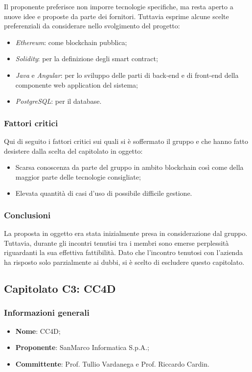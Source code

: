 \documentclass[11pt]{article}
\begin{document}
        \noindent
        Il proponente preferisce non imporre tecnologie specifiche, ma resta aperto a nuove idee e proposte da parte dei fornitori.
        Tuttavia esprime alcune scelte preferenziali da considerare nello svolgimento del progetto:	
        \begin{itemize}
		    \item \textit{Ethereum}: come blockchain pubblica;
		    \item \textit{Solidity}: per la definizione degli smart contract;
			\item \textit{Java} e \textit{Angular}: per lo sviluppo delle parti di back-end e di front-end della componente
			web application del sistema;
			\item \textit{PostgreSQL}: per il database.
		\end{itemize}
    
    \subsubsection{Fattori critici}
    Qui di seguito i fattori critici sui quali si è soffermato il gruppo e che hanno fatto desistere dalla scelta del capitolato in
    oggetto:
   	\begin{itemize}
		\item Scarsa conoscenza da parte del gruppo in ambito blockchain così come della maggior parte delle tecnologie consigliate;
		\item Elevata quantità di casi d'uso di possibile difficile gestione.
	\end{itemize}
	
    \subsubsection{Conclusioni}
    La proposta in oggetto era stata inizialmente presa in considerazione dal gruppo. Tuttavia, durante gli incontri tenutisi tra i membri
    sono emerse perplessità riguardanti la sua effettiva fattibilità. Dato che l'incontro tenutosi con l'azienda ha risposto solo
    parzialmente ai dubbi, si è scelto di escludere questo capitolato. 
    
    \newpage


\subsection{Capitolato C3: CC4D}

    \subsubsection{Informazioni generali}
    \begin{itemize}
        \item \textbf{Nome}: CC4D;
        \item \textbf{Proponente}: SanMarco Informatica S.p.A.;
        \item \textbf{Committente}: Prof. Tullio Vardanega e Prof. Riccardo Cardin.
    \end{itemize}
    
\end{document}
